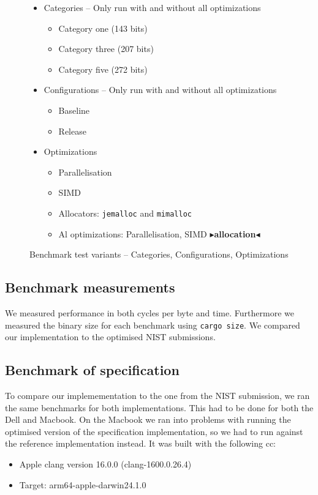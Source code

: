\documentclass[11pt]{report}
\theoremstyle{definition}
\theoremstyle{plain}
\newcommand{\todo}[1]{{\color[rgb]{.5,0,0}\textbf{$\blacktriangleright$#1$\blacktriangleleft$}}}
\begin{document}
\begin{figure}
  \begin{itemize}
    \item Categories -- Only run with and without all optimizations
          \begin{itemize}
            \item Category one (143 bits)
            \item Category three (207 bits)
            \item Category five (272 bits)
          \end{itemize}
    \item Configurations -- Only run with and without all optimizations
          \begin{itemize}
            \item Baseline
            \item Release
          \end{itemize}
    \item Optimizations
          \begin{itemize}
            \item Parallelisation
            \item SIMD
            \item Allocators: \texttt{jemalloc} and \texttt{mimalloc}
            \item Al optimizations: Parallelisation, SIMD \todo{allocation}
          \end{itemize}
  \end{itemize}
  \caption{Benchmark test variants -- Categories, Configurations, Optimizations}
\end{figure}

\subsection{Benchmark measurements}\label{sub:bench_measurements}
We measured performance in both cycles per byte and time. Furthermore we measured the binary size for each benchmark using \texttt{cargo size}. We compared our implementation to the optimised NIST submissions.

\subsection{Benchmark of specification}
To compare our implemementation to the one from the NIST submission, we ran the same benchmarks for both implementations. This had to be done for both the Dell and Macbook. On the Macbook we ran into problems with running the optimised version of the specification implementation, so we had to run against the reference implementation instead. It was built with the following cc:
\begin{itemize}
  \item Apple clang version 16.0.0 (clang-1600.0.26.4)
  \item Target: arm64-apple-darwin24.1.0
\end{itemize}
\end{document}
